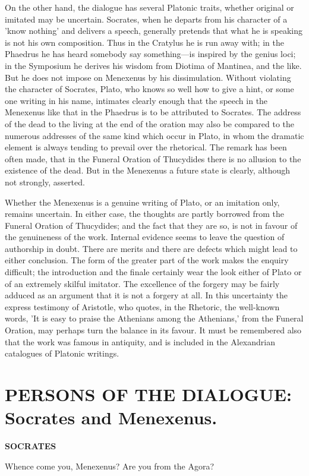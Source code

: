 \documentclass[11pt,letter]{article}
\begin{document}
\par  On the other hand, the dialogue has several Platonic traits, whether original or imitated may be uncertain. Socrates, when he departs from his character of a 'know nothing' and delivers a speech, generally pretends that what he is speaking is not his own composition. Thus in the Cratylus he is run away with; in the Phaedrus he has heard somebody say something—is inspired by the genius loci; in the Symposium he derives his wisdom from Diotima of Mantinea, and the like. But he does not impose on Menexenus by his dissimulation. Without violating the character of Socrates, Plato, who knows so well how to give a hint, or some one writing in his name, intimates clearly enough that the speech in the Menexenus like that in the Phaedrus is to be attributed to Socrates. The address of the dead to the living at the end of the oration may also be compared to the numerous addresses of the same kind which occur in Plato, in whom the dramatic element is always tending to prevail over the rhetorical. The remark has been often made, that in the Funeral Oration of Thucydides there is no allusion to the existence of the dead. But in the Menexenus a future state is clearly, although not strongly, asserted.

\par  Whether the Menexenus is a genuine writing of Plato, or an imitation only, remains uncertain. In either case, the thoughts are partly borrowed from the Funeral Oration of Thucydides; and the fact that they are so, is not in favour of the genuineness of the work. Internal evidence seems to leave the question of authorship in doubt. There are merits and there are defects which might lead to either conclusion. The form of the greater part of the work makes the enquiry difficult; the introduction and the finale certainly wear the look either of Plato or of an extremely skilful imitator. The excellence of the forgery may be fairly adduced as an argument that it is not a forgery at all. In this uncertainty the express testimony of Aristotle, who quotes, in the Rhetoric, the well-known words, 'It is easy to praise the Athenians among the Athenians,' from the Funeral Oration, may perhaps turn the balance in its favour. It must be remembered also that the work was famous in antiquity, and is included in the Alexandrian catalogues of Platonic writings.

\par 
\section{
      PERSONS OF THE DIALOGUE: Socrates and Menexenus.
    }
\par \textbf{SOCRATES}
\par   Whence come you, Menexenus? Are you from the Agora?
\end{document}
